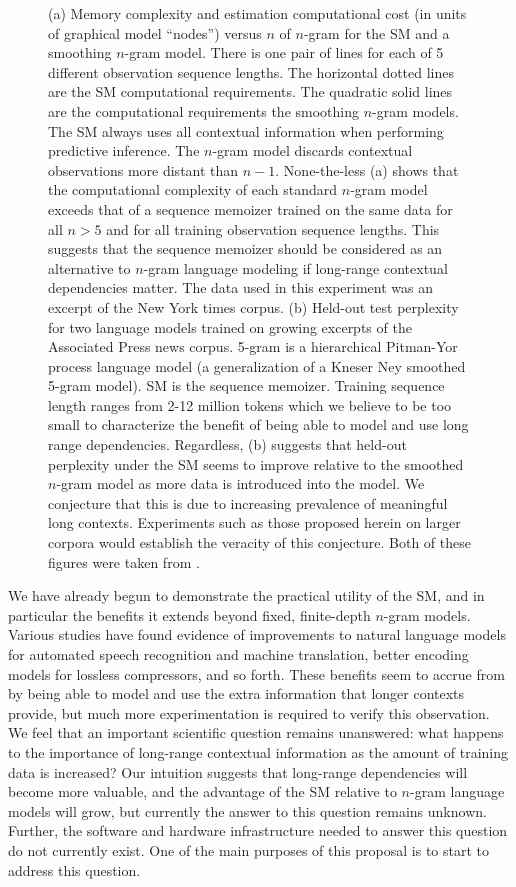 \documentclass[12pt]{article}
\begin{document}
{\begin{figure}[htbp]
\begin{center}
\caption{(a)  Memory complexity and estimation computational cost (in units of graphical model ``nodes'') versus $n$ of $n$-gram for the SM and a smoothing $n$-gram model.  There is one pair of lines for each of 5 different observation sequence lengths.  The horizontal dotted lines are the SM computational requirements.  The quadratic solid lines are the computational requirements the  smoothing $n$-gram models.  The SM always uses all contextual information when performing predictive inference.  The $n$-gram model discards contextual observations more distant than $n-1$.  None-the-less (a) shows that the computational complexity of each standard $n$-gram model exceeds that of a sequence memoizer trained on the same data for all $n>5$ and for all training observation sequence lengths.  This suggests that the sequence memoizer should be considered as an alternative to $n$-gram language modeling if long-range contextual dependencies matter.  The data used in this experiment was an excerpt of the New York times corpus.  (b)  Held-out test perplexity for two language models trained on growing excerpts of the Associated Press news corpus.  5-gram is a hierarchical Pitman-Yor process language model (a generalization of a Kneser Ney smoothed 5-gram model).  SM is the sequence memoizer.  Training sequence length ranges from 2-12 million tokens which we believe to be too small to characterize the benefit of being able to model and use long range dependencies.  Regardless, (b) suggests that held-out perplexity under the SM seems to improve relative to the smoothed $n$-gram model as more data is introduced into the model.  We conjecture that this is due to increasing prevalence of meaningful long contexts.  Experiments such as those proposed herein on larger corpora would establish the veracity of this conjecture.  Both of these figures were taken from \cite{Wood2009}.}
\label{default}
\end{center}
\end{figure}

We have already begun to demonstrate the practical utility of the SM, and in particular the benefits it extends beyond fixed, finite-depth $n$-gram models.  Various studies have found evidence of improvements to natural language models for automated speech recognition and machine translation, better encoding models for lossless compressors, and so forth.  These benefits seem to accrue from by being able to model and use the extra information that longer contexts provide, but much more experimentation is required to verify this observation.  We feel that an important scientific question remains unanswered: what happens to the importance of long-range contextual information as the amount of training data is increased?  Our intuition suggests that long-range dependencies will become more valuable, and the advantage of the SM relative to $n$-gram language models will grow, but currently the answer to this question remains unknown.   Further, the software and hardware infrastructure needed to answer this question do not currently exist.  One of the main purposes of this proposal is to start to address this question.

}
\end{document}
